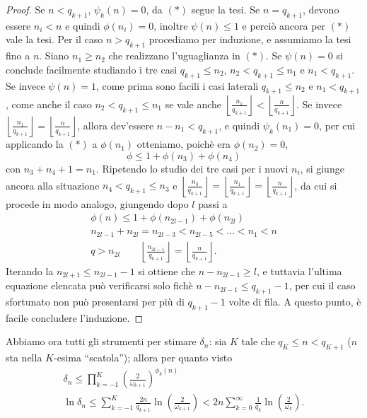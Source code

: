 \begin{proof}
 Se $n<q_{k+1}$, $\psi_k(n)=0$, da $(*)$ segue la tesi. Se $n=q_{k+1}$, devono essere $n_i<n$ e quindi $\phi(n_i)=0$, inoltre $\psi(n)\leq 1$ e perciò ancora per $(*)$ vale la tesi. \newline
 Per il caso $n>q_{k+1}$ procediamo per induzione, e assumiamo la tesi fino a $n$. Siano $n_1\geq n_2$ che realizzano l'uguaglianza in $(*)$. Se $\psi(n)=0$ si conclude facilmente studiando i tre casi $q_{k+1}\leq n_2$, $n_2<q_{k+1}\leq n_1$ e $n_1<q_{k+1}$. Se invece $\psi(n)=1$, come prima sono facili i casi laterali $q_{k+1}\leq n_2$ e $n_1<q_{k+1}$, come anche il caso $n_2<q_{k+1}\leq n_1$ se vale anche $\left\lfloor\frac{n_1}{q_{k+1}} \right\rfloor<\left\lfloor\frac{n}{q_{k+1}} \right\rfloor$. Se invece $\left\lfloor\frac{n_1}{q_{k+1}} \right\rfloor=\left\lfloor\frac{n}{q_{k+1}} \right\rfloor$, allora dev'essere $n-n_1<q_{k+1}$, e quindi $\psi_k(n_1)=0$, per cui applicando la $(*)$ a $\phi(n_1)$ otteniamo, poichè era $\phi(n_2)=0$,
 \[\phi\leq 1+\phi(n_3)+\phi(n_4)\]
 con $n_3+n_4+1=n_1$. Ripetendo lo studio dei tre casi per i nuovi $n_i$, si giunge ancora alla situazione $n_4<q_{k+1}\leq n_3$ e $\left\lfloor\frac{n_3}{q_{k+1}} \right\rfloor=\left\lfloor\frac{n_1}{q_{k+1}} \right\rfloor=\left\lfloor\frac{n}{q_{k+1}} \right\rfloor$, da cui si procede in modo analogo, giungendo dopo $l$ passi a
 \begin{eqnarray*}
  \phi(n)\leq 1+\phi(n_{2l-1})+\phi(n_{2l})\\
  n_{2l-1}+n_{2l}=n_{2l-3}<n_{2l-5}<\dots<n_1<n\\
  q>n_{2l} \qquad \left\lfloor\frac{n_{2l-1}}{q_{k+1}} \right\rfloor=\left\lfloor\frac{n}{q_{k+1}} \right\rfloor.
 \end{eqnarray*}
Iterando la $n_{2l+1}\leq n_{2l-1}-1$ si ottiene che $n-n_{2l-1}\geq l$, e tuttavia l'ultima equazione elencata può verificarsi solo fichè $n-n_{2l-1}\leq q_{k+1}-1$, per cui il caso sfortunato non può presentarsi per più di $q_{k+1}-1$ volte di fila. A questo punto, è facile concludere l'induzione. 
\end{proof}
 
Abbiamo ora tutti gli strumenti per stimare $\delta_n$: sia $K$ tale che $q_K\leq n<q_{K+1}$ ($n$ sta nella $K$-esima ``scatola''); allora per quanto visto
\begin{eqnarray*}
 \delta_n\leq\prod_{k=-1}^K \left(\frac{2}{\omega_{k+1}}\right)^{\phi_k(n)}\\
 \ln\delta_n\leq \sum_{k=-1}^K \frac{2n}{q_{k+1}}\ln\left(\frac{2}{\omega_{k+1}}\right)<2n\sum_{k=0}^\infty \frac{1}{q_k}\ln\left(\frac{2}{\omega_k}\right).
\end{eqnarray*}

